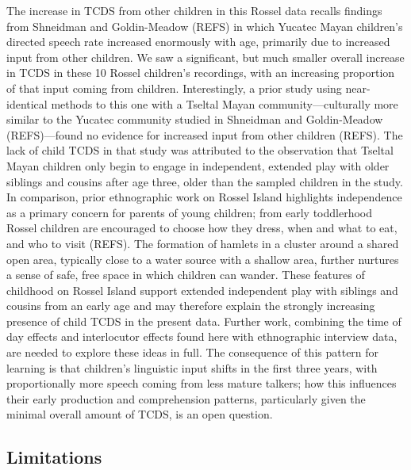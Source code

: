\documentclass[,man,floatsintext]{apa6}
\begin{document}
The increase in TCDS from other children in this Rossel data recalls
findings from Shneidman and Goldin-Meadow (REFS) in which Yucatec Mayan
children's directed speech rate increased enormously with age, primarily
due to increased input from other children. We saw a significant, but
much smaller overall increase in TCDS in these 10 Rossel children's
recordings, with an increasing proportion of that input coming from
children. Interestingly, a prior study using near-identical methods to
this one with a Tseltal Mayan community---culturally more similar to the
Yucatec community studied in Shneidman and Goldin-Meadow (REFS)---found
no evidence for increased input from other children (REFS). The lack of
child TCDS in that study was attributed to the observation that Tseltal
Mayan children only begin to engage in independent, extended play with
older siblings and cousins after age three, older than the sampled
children in the study. In comparison, prior ethnographic work on Rossel
Island highlights independence as a primary concern for parents of young
children; from early toddlerhood Rossel children are encouraged to
choose how they dress, when and what to eat, and who to visit (REFS).
The formation of hamlets in a cluster around a shared open area,
typically close to a water source with a shallow area, further nurtures
a sense of safe, free space in which children can wander. These features
of childhood on Rossel Island support extended independent play with
siblings and cousins from an early age and may therefore explain the
strongly increasing presence of child TCDS in the present data. Further
work, combining the time of day effects and interlocutor effects found
here with ethnographic interview data, are needed to explore these ideas
in full. The consequence of this pattern for learning is that children's
linguistic input shifts in the first three years, with proportionally
more speech coming from less mature talkers; how this influences their
early production and comprehension patterns, particularly given the
minimal overall amount of TCDS, is an open question.

\subsection{Limitations}\label{limitations}
\end{document}
